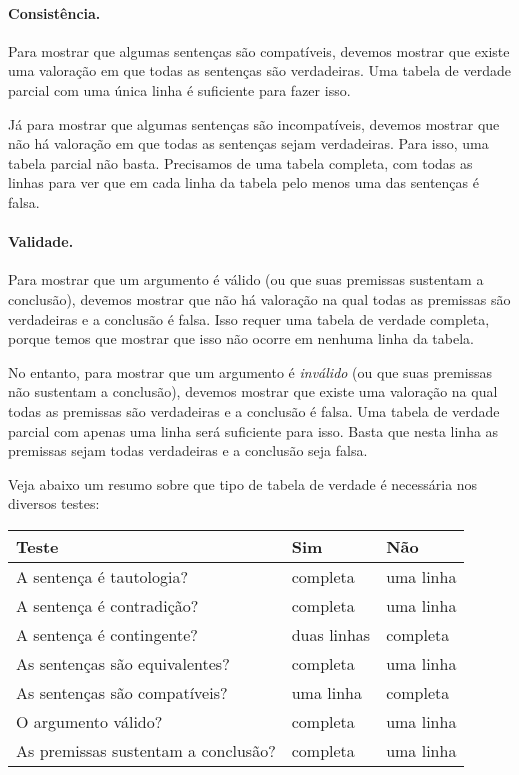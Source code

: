 \paragraph{Consistência.}
Para mostrar que algumas sentenças são compatíveis, devemos mostrar que existe uma valoração em que todas as sentenças são verdadeiras.
Uma tabela de verdade parcial com uma única linha é suficiente para fazer isso.

Já para mostrar que algumas sentenças são incompatíveis, devemos mostrar que não há valoração em que todas as sentenças sejam verdadeiras. 
Para isso, uma tabela parcial não basta. Precisamos de uma tabela completa, com todas as linhas para ver que em cada linha da tabela pelo menos uma das sentenças é falsa.

\paragraph{Validade.}
Para mostrar que um argumento é válido (ou que suas premissas sustentam a conclusão), devemos mostrar que não há valoração na qual todas as premissas são verdadeiras e a conclusão é falsa.
Isso requer uma tabela de verdade completa, porque temos que mostrar que isso não ocorre em nenhuma linha da tabela.

No entanto, para mostrar que um argumento é \emph{inválido} (ou que suas premissas não sustentam a conclusão), devemos mostrar que existe uma valoração na qual todas as premissas são verdadeiras e a conclusão é falsa.
Uma tabela de verdade parcial com apenas uma linha será suficiente para isso.
Basta que nesta linha as premissas sejam todas verdadeiras e a conclusão seja falsa.

Veja abaixo um resumo sobre que tipo de tabela de verdade é necessária nos diversos testes:
\begin{center}\label{t:TruthTable}
\begin{tabular}{l l l}
\cline{1-3}
\textbf{Teste} & \textbf{Sim} & \textbf{Não}\\
 \hline
\cline{1-3}
{\small A sentença é tautologia?} & {\small completa} & {\small uma linha} \\
{\small A sentença é  contradição?} &  {\small completa} & {\small uma linha} \\
{\small A sentença é contingente?} & {\small duas linhas} & {\small completa}\\
{\small As sentenças são equivalentes?} & {\small completa}  & {\small uma linha} \\
{\small As sentenças são compatíveis?} & {\small uma linha} & {\small completa} \\
{\small O argumento válido?} & {\small completa} & {\small uma linha} \\
{\small As premissas sustentam a conclusão?} & {\small completa} & {\small uma linha}\\
\cline{1-3}
\end{tabular}
\end{center}
\label{table.CompleteVsPartial}


